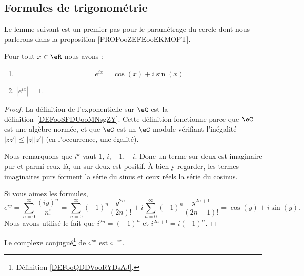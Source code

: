 \subsection{Formules de trigonométrie}

Le lemme suivant est un premier pas pour le paramétrage du cercle dont nous parlerons dans la proposition \ref{PROPooZEFEooEKMOPT}.
\begin{lemma}       \label{LEMooHOYZooKQTsXW}
	Pour tout \( x\in \eR\) nous avons :
	\begin{enumerate}
		\item
		      \begin{equation}        \label{EQooRVPJooTMwNTU}
			      e^{ix}=\cos(x)+i\sin(x)
		      \end{equation}
		\item
		      \( |  e^{ix} |=1\).
	\end{enumerate}
\end{lemma}

\begin{proof}
	La définition de l'exponentielle sur \( \eC\) est la définition~\ref{DEFooSFDUooMNsgZY}. Cette définition fonctionne parce que \( \eC\) est une algèbre normée, et que \( \eC\) est un \( \eC\)-module vérifiant l'inégalité \(  | zz' |\leq | z | |z' | \) (en l'occurrence, une égalité).

	Nous remarquons que \( i^k\) vaut \( 1\), \( i\), \( -1\), \( -i\). Donc un terme sur deux est imaginaire pur et parmi ceux-là, un sur deux est positif. À bien y regarder, les termes imaginaires purs forment la série du sinus et ceux réels la série du cosinus.

	Si vous aimez les formules,
	\begin{equation}
		e^{iy}=\sum_{n=0}^{\infty}\frac{ (iy)^n }{ n! }
		=\sum_{n=0}^{\infty}(-1)^n\frac{ y^{2n} }{ (2n)! }+i\sum_{n=0}^{\infty}(-1)^n\frac{ y^{2n+1} }{ (2n+1)! }
		=\cos(y)+i\sin(y).
	\end{equation}
	Nous avons utilisé le fait que \( i^{2n}=(-1)^n\) et \( i^{2n+1}=i(-1)^n\).
\end{proof}

\begin{corollary}       \label{CORooWZFIooDTCoRo}
	Le complexe conjugué\footnote{Définition \ref{DEFooQDDVooRYDsAJ}.} de \(  e^{ix}\) est \(  e^{-ix}\).
\end{corollary}

